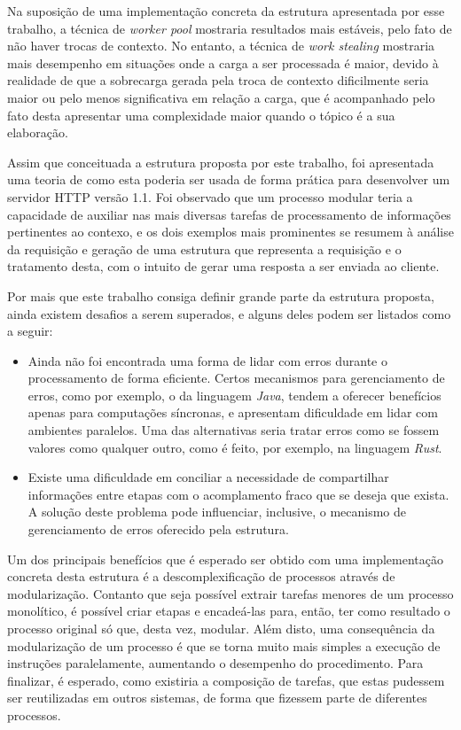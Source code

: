  Na suposição de uma implementação concreta da estrutura apresentada por esse trabalho, a técnica de \textit{worker pool} mostraria resultados mais estáveis, pelo fato de não haver trocas de contexto. No entanto, a técnica de \textit{work stealing} mostraria mais desempenho em situações onde a carga a ser processada é maior, devido à realidade de que a sobrecarga gerada pela troca de contexto dificilmente seria maior ou pelo menos significativa em relação a carga, que é acompanhado pelo fato desta apresentar uma complexidade maior quando o tópico é a sua elaboração.
  
  Assim que conceituada a estrutura proposta por este trabalho, foi apresentada uma teoria de como esta poderia ser usada de forma prática para desenvolver um servidor HTTP versão 1.1. Foi observado que um processo modular teria a capacidade de auxiliar nas mais diversas tarefas de processamento de informações pertinentes ao contexo, e os dois exemplos mais prominentes se resumem à análise da requisição e geração de uma estrutura que representa a requisição e o tratamento desta, com o intuito de gerar uma resposta a ser enviada ao cliente.
  
  Por mais que este trabalho consiga definir grande parte da estrutura proposta, ainda existem desafios a serem superados, e alguns deles podem ser listados como a seguir:
  
  \begin{itemize}
    \item Ainda não foi encontrada uma forma de lidar com erros durante o processamento de forma eficiente. Certos mecanismos para gerenciamento de erros, como por exemplo, o da linguagem \textit{Java}, tendem a oferecer benefícios apenas para computações síncronas, e apresentam dificuldade em lidar com ambientes paralelos. Uma das alternativas seria tratar erros como se fossem valores como qualquer outro, como é feito, por exemplo, na linguagem \textit{Rust}.
    \item Existe uma dificuldade em conciliar a necessidade de compartilhar informações entre etapas com o acomplamento fraco que se deseja que exista. A solução deste problema pode influenciar, inclusive, o mecanismo de gerenciamento de erros oferecido pela estrutura.
  \end{itemize}
  
  Um dos principais benefícios que é esperado ser obtido com uma implementação concreta desta estrutura é a descomplexificação de processos através de modularização. Contanto que seja possível extrair tarefas menores de um processo monolítico, é possível criar etapas e encadeá-las para, então, ter como resultado o processo original só que, desta vez, modular. Além disto, uma consequência da modularização de um processo é que se torna muito mais simples a execução de instruções paralelamente, aumentando o desempenho do procedimento. Para finalizar, é esperado, como existiria a composição de tarefas, que estas pudessem ser reutilizadas em outros sistemas, de forma que fizessem parte de diferentes processos.
  
